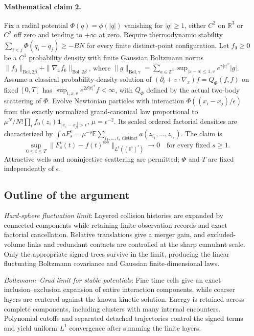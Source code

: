 \documentclass[11pt]{article}
\begin{document}
\paragraph{Mathematical claim 2.} Fix a radial potential $\Phi(q)=\phi(|q|)$ vanishing for $|q|\ge1$, either $C^2$ on $\mathbb R^3$ or $C^2$ off zero and tending to $+\infty$ at zero. Require thermodynamic stability $\sum_{i<j}\Phi(q_i-q_j)\ge-BN$ for every finite distinct-point configuration. Let $f_0\ge0$ be a $C^1$ probability density with finite Gaussian Boltzmann norms $\|f_0\|_{\mathrm{Bol},2\beta}+\|\nabla_xf_0\|_{\mathrm{Bol},2\beta}$, where $\|g\|_{\mathrm{Bol},\gamma}=\sum_{a\in\mathbb Z^3}\sup_{|x-a|\le1,v}e^{\gamma|v|^2}|g|$. Assume a classical probability-density solution of $(\partial_t+v\cdot\nabla_x)f=Q_\Phi(f,f)$ on fixed $[0,T]$ has $\sup_{t,x,v}e^{2\beta|v|^2}f<\infty$, with $Q_\Phi$ defined by the actual two-body scattering of $\Phi$. Evolve Newtonian particles with interaction $\Phi((x_i-x_j)/\epsilon)$ from the exactly normalized grand-canonical law proportional to $\mu^N/N!\prod_if_0(z_i)\mathbf1_{|x_i-x_j|>\epsilon}$, $\mu=\epsilon^{-2}$. Its scaled ordered factorial densities are characterized by $\int aF_s^\epsilon=\mu^{-s}\mathbb E\sum_{i_1,\ldots,i_s\text{ distinct}}a(z_{i_1},\ldots,z_{i_s})$. The claim is \[\sup_{0\le t\le T}\|F_s^\epsilon(t)-f(t)^{\otimes s}\|_{L^1((\mathbb R^6)^s)}\longrightarrow0\quad\text{for every fixed }s\ge1.\] Attractive wells and noninjective scattering are permitted; $\Phi$ and $T$ are fixed independently of $\epsilon$.

\subsection{Outline of the argument}
\textit{Hard-sphere fluctuation limit}: Layered collision histories are expanded by connected components while retaining finite observation records and exact factorial cancellation. Relative translations give a merger gain, and excluded-volume links and redundant contacts are controlled at the sharp cumulant scale. Only the appropriate signed trees survive in the limit, producing the linear fluctuating Boltzmann covariance and Gaussian finite-dimensional laws.

\textit{Boltzmann--Grad limit for stable potentials}: Fine time cells give an exact inclusion--exclusion expansion of entire interaction components, while coarser layers are centered against the known kinetic solution. Energy is retained across complete components, including clusters with many internal encounters. Polynomial cutoffs and separated detached trajectories control the signed terms and yield uniform $L^1$ convergence after summing the finite layers.
\end{document}
